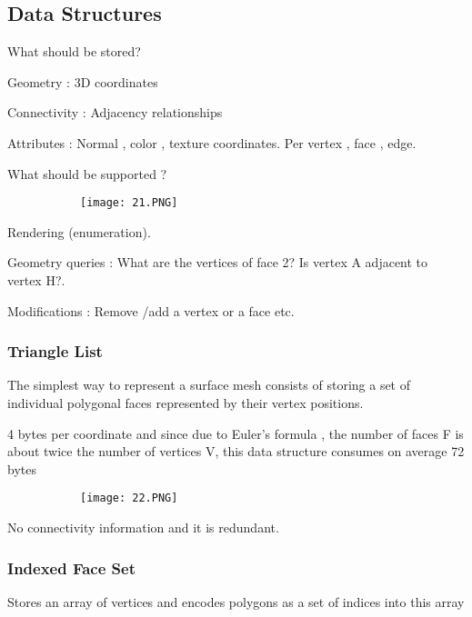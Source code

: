 \documentclass{article}
\begin{document}
\subsection{Data Structures}

What should be stored?

Geometry : 3D coordinates

Connectivity : Adjacency relationships

Attributes : Normal , color , texture coordinates. Per vertex , face , edge.

What should be supported ? 


\begin{figure}[ht!]
  \centering
  \begin{subfigure}[b]{0.3\linewidth}
    \texttt{[image: 21.PNG]}
  \end{subfigure}
\end{figure}

Rendering (enumeration).

Geometry queries : What are the vertices of face 2? Is vertex A adjacent to vertex H?.

Modifications : Remove /add a vertex or a face etc.

\subsubsection{Triangle List}

The simplest way to represent a surface mesh consists of storing a set of individual polygonal faces represented by their vertex positions.

4 bytes per coordinate and since due to Euler's formula , the number of faces F is about twice the number of vertices V, this data structure consumes on average 72 bytes 


\begin{figure}[ht!]
  \centering
  \begin{subfigure}[b]{0.2\linewidth}
    \texttt{[image: 22.PNG]}
  \end{subfigure}
\end{figure}

No connectivity information and it is redundant.

\subsubsection{Indexed Face Set}

Stores an array of vertices and encodes polygons as a set of indices into this array
\end{document}
